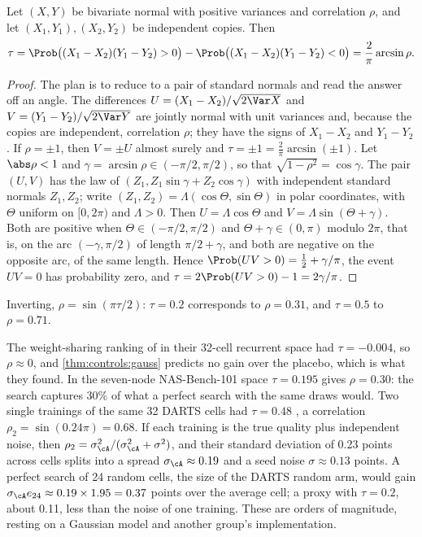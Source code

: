 \begin{refsection}
\begin{lemma}\label{lem:controls:kendall}
Let $(X,Y)$ be bivariate normal with positive variances and correlation $\rho$, and let $(X_1,Y_1),(X_2,Y_2)$ be independent copies. Then
\[
  \tau=\Prob\bigl((X_1-X_2)(Y_1-Y_2)>0\bigr)-\Prob\bigl((X_1-X_2)(Y_1-Y_2)<0\bigr)=\frac2\pi\arcsin\rho .
\]
\end{lemma}

\begin{proof}
The plan is to reduce to a pair of standard normals and read the answer off an angle. The differences $U=(X_1-X_2)/\sqrt{2\Var X}$ and $V=(Y_1-Y_2)/\sqrt{2\Var Y}$ are jointly normal with unit variances and, because the copies are independent, correlation $\rho$; they have the signs of $X_1-X_2$ and $Y_1-Y_2$. If $\rho=\pm1$, then $V=\pm U$ almost surely and $\tau=\pm1=\frac2\pi\arcsin(\pm1)$. Let $\abs\rho<1$ and $\gamma=\arcsin\rho\in(-\pi/2,\pi/2)$, so that $\sqrt{1-\rho^2}=\cos\gamma$. The pair $(U,V)$ has the law of $(Z_1,Z_1\sin\gamma+Z_2\cos\gamma)$ with independent standard normals $Z_1,Z_2$; write $(Z_1,Z_2)=\Lambda(\cos\Theta,\sin\Theta)$ in polar coordinates, with $\Theta$ uniform on $[0,2\pi)$ and $\Lambda>0$. Then $U=\Lambda\cos\Theta$ and $V=\Lambda\sin(\Theta+\gamma)$. Both are positive when $\Theta\in(-\pi/2,\pi/2)$ and $\Theta+\gamma\in(0,\pi)$ modulo $2\pi$, that is, on the arc $(-\gamma,\pi/2)$ of length $\pi/2+\gamma$, and both are negative on the opposite arc, of the same length. Hence $\Prob(UV>0)=\frac12+\gamma/\pi$, the event $UV=0$ has probability zero, and $\tau=2\Prob(UV>0)-1=2\gamma/\pi$.
\end{proof}

Inverting, $\rho=\sin(\pi\tau/2)$: $\tau=0.2$ corresponds to $\rho=0.31$, and $\tau=0.5$ to $\rho=0.71$.

\begin{example}\label{exa:controls:reading}
The weight-sharing ranking of \textcite{YuEtAl2020} in their 32-cell recurrent space had $\tau=-0.004$, so $\rho\approx0$, and \cref{thm:controls:gauss} predicts no gain over the placebo, which is what they found. In the seven-node NAS-Bench-101 space $\tau=0.195$ gives $\rho=0.30$: the search captures 30\% of what a perfect search with the same draws would. Two single trainings of the same 32 DARTS cells had $\tau=0.48$ \parencite{YangEsperancaCarlucci2020}, a correlation $\rho_2=\sin(0.24\pi)=0.68$. If each training is the true quality plus independent noise, then $\rho_2=\sigma_{\cA}^2/(\sigma_{\cA}^2+\sigma^2)$, and their standard deviation of 0.23 points across cells splits into a spread $\sigma_{\cA}\approx0.19$ and a seed noise $\sigma\approx0.13$ points. A perfect search of 24 random cells, the size of the DARTS random arm, would gain $\sigma_{\cA}e_{24}\approx0.19\times1.95=0.37$ points over the average cell; a proxy with $\tau=0.2$, about 0.11, less than the noise of one training. These are orders of magnitude, resting on a Gaussian model and another group's implementation.
\end{example}


\end{refsection}
